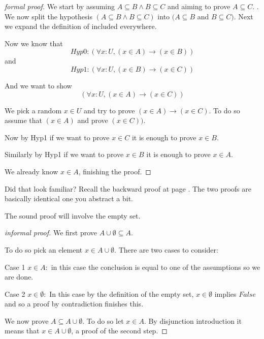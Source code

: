 \begin{proof}[formal proof]  We start by assuming  $A\subseteq B \land B \subseteq C$ and aiming to prove $A \subseteq C$.
.
We now split the hypothesis  $(A\subseteq B \land B \subseteq C)$  into  $(A\subseteq B$  and  $B \subseteq C)$.
 Next we expand the definition of included everywhere.
 
 

Now we know that 
$$Hyp0: (\forall x : U, (x \in A) \rightarrow (x \in B))$$
and 
$$Hyp1: (\forall x : U, (x \in B) \rightarrow (x \in C))$$

And we want to show $$(\forall x : U, (x \in A) \rightarrow (x \in C))$$

We pick a random $x\in U$ and try to prove $(x \in A) \rightarrow (x \in C)$. To do so assume that $(x \in A)$ and prove $ (x \in C))$.



Now by Hyp1 if we want to prove $x\in C$ it is enough to prove $x \in B$.

Similarly by Hyp1 if we want to prove $x\in B$ it is enough to prove $x \in A$.

We already know $x \in A$, finishing the proof.



\end{proof}
Did that look familiar? Recall the backward proof at page \pageref{backward Socrates}. The two proofs are basically identical one you abstract a bit.


The sound proof will involve the empty set.


\begin{proof}[informal proof]

We first prove {\bf $A\cup \emptyset \subseteq A.$}

To do so pick an element $x \in A\cup \emptyset$. There are two cases to consider:

Case 1  $x\in A:$ in this case the conclusion is equal to one of the assumptions so we are done.

Case 2  ${x \in \emptyset:}$ In this  case by the definition of the empty set, $x \in \emptyset$ implies $False$ and so a proof by contradiction finishes this.

We now prove $A \subseteq A\cup \emptyset$. To do so let $x \in A$. By disjunction introduction it means that $ x \in A \cup \emptyset$, a proof of the second step.

\end{proof}

